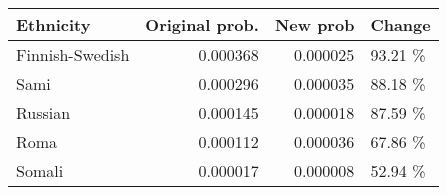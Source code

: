 \begin{tabular}{lrrl}
\toprule
      Ethnicity &  Original prob. &  New prob &  Change \\
\midrule
Finnish-Swedish &        0.000368 &  0.000025 & 93.21 \% \\
           Sami &        0.000296 &  0.000035 & 88.18 \% \\
        Russian &        0.000145 &  0.000018 & 87.59 \% \\
           Roma &        0.000112 &  0.000036 & 67.86 \% \\
         Somali &        0.000017 &  0.000008 & 52.94 \% \\
\bottomrule
\end{tabular}
